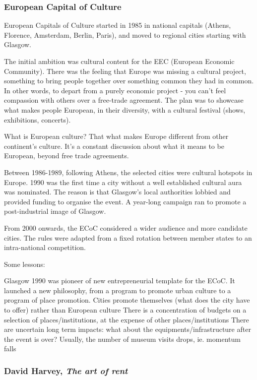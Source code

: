 \documentclass{article}
\begin{document}
\subsubsection{European Capital of Culture}

European Capitals of Culture started in 1985 in national capitals (Athens, Florence, Amsterdam, Berlin, Paris), and moved to regional cities starting with Glasgow.

The initial ambition was cultural content for the EEC (European Economic Community). There was the feeling that Europe was missing a cultural project, something to bring people together over something common they had in common. In other words, to depart from a  purely economic project - you can't feel compassion with others over a free-trade agreement. The plan was to showcase what makes people European, in their diversity, with a cultural festival (shows, exhibitions, concerts).

What is European culture? That what makes Europe different from other continent's culture. It's a constant discussion about what it means to be European, beyond free trade agreements.

Between 1986-1989, following Athens, the selected cities were cultural hotspots in Europe. 
1990 was the first time a city without a well established cultural aura was nominated. The reason is that Glasgow's local authorities lobbied and provided funding to organise the event. A year-long campaign ran to promote a post-industrial image of Glasgow.

From 2000 onwards, the ECoC considered a wider audience and more candidate cities. The rules were adapted from a fixed rotation between member states to an intra-national competition. 

Some lessons:
\begin{outline}
	\1 Glasgow 1990 was pioneer of new entrepreneurial template for the ECoC. It launched a new philosophy, from a program to promote urban culture to a program of place promotion. Cities promote themselves (what does the city have to offer) rather than European culture
	\1 There is a concentration of budgets on a selection of places/institutions, at the expense of other places/institutions
	\1 There are uncertain long term impacts: what about the equipments/infrastructure after the event is over? Usually, the number of museum visits drops, ie. momentum falls
\end{outline}

\subsubsection{David Harvey, \textit{The art of rent}}
\end{document}
